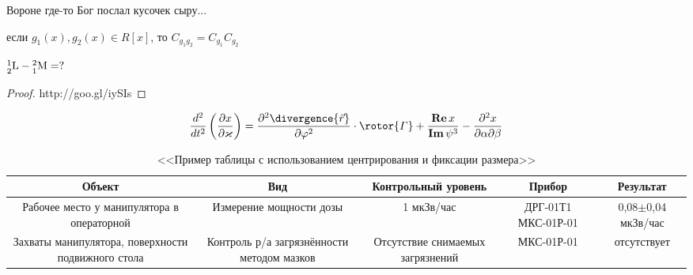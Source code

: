 \documentclass[14pt,final,titlepage]{hedreport}
\begin{document}
	\begin{proposition}
		Вороне где-то Бог послал кусочек сыру...
	\end{proposition}
	\begin{comment}
		наверное TCP/IP пакетом
	\end{comment}
	\begin{lemma}
		если \( g_1(x), g_2(x) \in R[x] \), то \( C_{g_1g_2} = C_{g_1} C_{g_2} \)
	\end{lemma}
	\begin{solution}
		\( \nucleus{1}{2}{L} - \nucleus{2}{1}{M} = ? \)
	\end{solution}
	\begin{proof}
		http://goo.gl/iySIs
	\end{proof}
	\[
		\dder{}{t}\left( \pder{x}{\kappa} \right) = 
			\ppder{\divergence{\vec{r}}}{\phi}\cdot\rotor{\Gamma} + 
			\frac{\Re{x}}{\Im{\psi^3}} - \pcder{x}{\alpha}{\beta}
	\]
	\begin{table}[ht]
		\centering
		\caption{<<Пример таблицы с использованием центрирования и фиксации размера>>}
		\begin{tabular}{|C{.2}|C{.2}|C{.17}|C{.18}|C{.15}|}
			\hline
			Объект & Вид & Контрольный уровень & Прибор & Результат \\ \hline
			Рабочее место у манипулятора в операторной & Измерение мощности дозы & 
				1 мкЗв/час & ДРГ-01Т1 МКС-01Р-01 & 0,08\( \pm \)0,04 мкЗв/час \\ \hline
			Захваты манипулятора, поверхности подвижного стола & Контроль р/а 
				загрязнённости методом мазков & Отсутствие снимаемых загрязнений &
				МКС-01Р-01 & отсутствует \\ \hline
		\end{tabular}
	\end{table}
\end{document}
